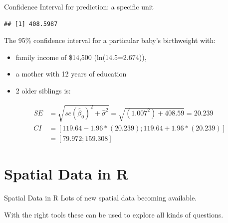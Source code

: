 \documentclass[
  ignorenonframetext,
]{beamer}
\newenvironment{Shaded}{\begin{snugshade}}{\end{snugshade}}
\newcommand{\CommentTok}[1]{\textcolor[rgb]{0.56,0.35,0.01}{\textit{#1}}}
\newcommand{\DecValTok}[1]{\textcolor[rgb]{0.00,0.00,0.81}{#1}}
\newcommand{\FunctionTok}[1]{\textcolor[rgb]{0.00,0.00,0.00}{#1}}
\newcommand{\NormalTok}[1]{#1}
\newcommand{\SpecialCharTok}[1]{\textcolor[rgb]{0.00,0.00,0.00}{#1}}
\begin{document}
\begin{frame}[fragile]{Confidence Interval for prediction: a specific
unit}
\protect\hypertarget{confidence-interval-for-prediction-a-specific-unit-7}{}
\small

\begin{Shaded}
\end{Shaded}

\begin{verbatim}
## [1] 408.5987
\end{verbatim}

\normalsize

The 95\% confidence interval for a particular baby's birthweight with:

\begin{itemize}
\item
  family income of \$14,500 (ln(14.5=2.674)),
\item
  a mother with 12 years of education
\item
  2 older siblings is:
\end{itemize}

\[
\begin{aligned}
SE&=\sqrt{se(\tilde{\beta_0})^2+\hat{\sigma}^2}=\sqrt{(1.007^2)+408.59}=20.239\\
CI&=[119.64-1.96*(20.239); 119.64+1.96*(20.239)]\\
&=[79.972;159.308]
\end{aligned}
\]
\end{frame}

\hypertarget{spatial-data-in-r}{%
\section{Spatial Data in R}\label{spatial-data-in-r}}

\begin{frame}{Spatial Data in R}
\protect\hypertarget{spatial-data-in-r-1}{}
Lots of new spatial data becoming available.

With the right tools these can be used to explore all kinds of
questions.
\end{frame}
\end{document}
